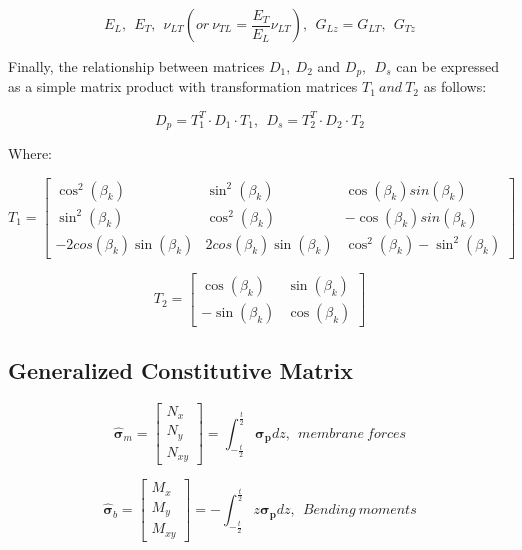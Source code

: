 \[E_{L},\ \ E_{T},\ \ \nu_{LT}\left( or\ \nu_{TL} = \frac{E_{T}}{E_{L}}\nu_{LT} \right),\ \ G_{Lz} = G_{LT},\ \ G_{Tz}\]

Finally, the relationship between matrices $D_{1},{\ D}_{2}$ and
$D_{p},\ \ D_{s}$ can be expressed as a simple matrix product with
transformation matrices $T_{1}\ and\ T_{2}$ as follows:

\begin{equation}    
D_{p} = T_{1}^{T} \cdot D_{1} \cdot T_{1},\ \ D_{s} = T_{2}^{T} \cdot D_{2} \cdot T_{2}
\end{equation}

Where:

\[T_{1} = \begin{bmatrix}
\cos^{2}\left( \beta_{k} \right) & \sin^{2}\left( \beta_{k} \right) & \cos\left( \beta_{k} \right)sin(\beta_{k}) \\
\sin^{2}\left( \beta_{k} \right) & \cos^{2}\left( \beta_{k} \right) & - \cos\left( \beta_{k} \right)sin(\beta_{k}) \\
 - {2cos}{\left( \beta_{k} \right)\sin\left( \beta_{k} \right)} & {2cos}{\left( \beta_{k} \right)\sin\left( \beta_{k} \right)} & \cos^{2}\left( \beta_{k} \right) - \sin^{2}\left( \beta_{k} \right)
\end{bmatrix}\]

\[T_{2} = \begin{bmatrix}
\cos\left( \beta_{k} \right) & \sin\left( \beta_{k} \right) \\
 - \sin\left( \beta_{k} \right) & \cos\left( \beta_{k} \right)
\end{bmatrix}\]


\subsection{Generalized Constitutive Matrix}
\label{generalized-constitutive-matrix}
\begin{equation}
{\hat{\boldsymbol{\sigma}}}_{m} = \begin{bmatrix}
N_{x} \\
N_{y} \\
N_{xy}
\end{bmatrix} = \int_{- \frac{t}{2}}^{\frac{t}{2}}{\boldsymbol{\sigma}_{\mathbf{p}}dz},\ \ membrane\ forces
\end{equation}

\begin{equation}    
{\hat{\boldsymbol{\sigma}}}_{b} = \begin{bmatrix}
M_x \\
M_y \\
M_{xy}
\end{bmatrix} = - \int_{- \frac{t}{2}}^{\frac{t}{2}}{z\boldsymbol{\sigma}_{\mathbf{p}}dz},\ \ Bending\ moments
\end{equation}

